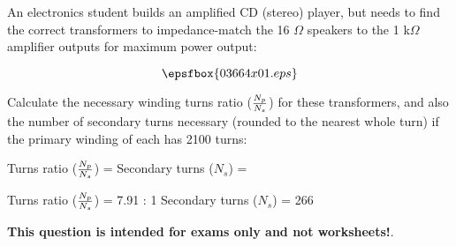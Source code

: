 

An electronics student builds an amplified CD (stereo) player, but needs to find the correct transformers to impedance-match the 16 $\Omega$ speakers to the 1 k$\Omega$ amplifier outputs for maximum power output:

$$\epsfbox{03664x01.eps}$$

Calculate the necessary winding turns ratio ($N_p \over N_s$) for these transformers, and also the number of secondary turns necessary (rounded to the nearest whole turn) if the primary winding of each has 2100 turns:

\vskip 10pt

Turns ratio ($N_p \over N_s$) = \hskip 150pt Secondary turns ($N_s$) = 







Turns ratio ($N_p \over N_s$) = 7.91 : 1 \hskip 100pt Secondary turns ($N_s$) = 266







{\bf This question is intended for exams only and not worksheets!}.



